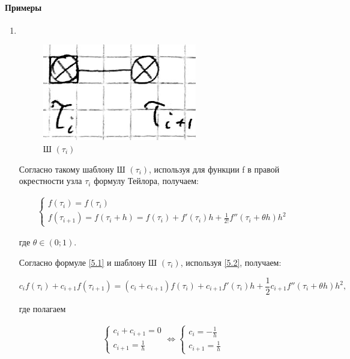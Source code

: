\documentclass[__main__.tex]{subfiles}
\begin{document}
\paragraph{Примеры}

\begin{enumerate}
	
	\item $ $
	\begin{figure}[h!]
		\centering
		\includegraphics[width=0.3\linewidth]{img/img_5-2}
		\caption{Ш $\left( \tau_i \right)$}
		\label{img_5.2}
	\end{figure}

	Согласно такому шаблону Ш $\left( \tau_i \right)$, используя для функции f в правой окрестности узла $\tau_i$ формулу Тейлора, получаем:
	
	\begin{gather}\label{5.2}
	\begin{cases}
	f \left( \tau_i \right) = f \left( \tau_i \right) \\
	f \left( \tau_{i+1} \right) = f \left( \tau_i + h \right) = f\left( \tau_i \right) + f'\left( \tau_i \right) h + \frac{1}{2!} f''\left(\tau_i + \theta h\right) h^2
	\end{cases}
	\end{gather}
	
	где $\theta \in \left( 0; 1 \right)$.
	
	Согласно формуле \ref{5.1} и шаблону Ш $\left( \tau_i \right)$, используя \ref{5.2}, получаем: 
	
	\begin{equation}\label{5.3}
	c_i f\left( \tau_i \right) + c_{i+1} f \left( \tau_{i+1} \right) = \left( c_i + c_{i+1} \right) f \left( \tau_i \right) + c_{i+1} f' \left( \tau_i \right) h + \frac{1}{2} c_{i+1} f''\left(\tau_i + \theta h\right)h^2,
	\end{equation}
		
	где полагаем
	
	\begin{gather}\label{5.4}
	\begin{cases}
	c_i + c_{i+1} = 0 \\
	c_{i+1} = \frac{1}{h}
	\end{cases}
	\Leftrightarrow
	\begin{cases}
	c_i = - \frac{1}{h} \\
	c_{i+1} = \frac{1}{h}
	\end{cases}
	\end{gather}
	

\end{enumerate}
\end{document}
